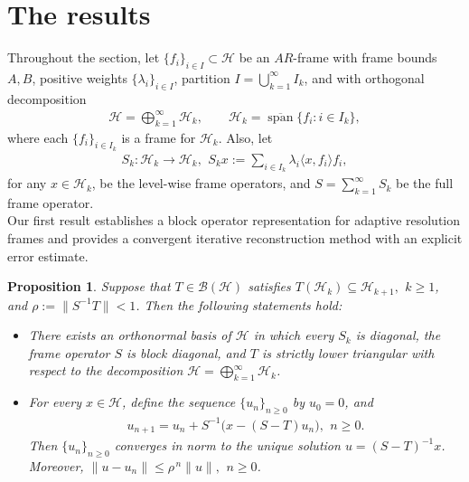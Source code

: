 \documentclass[12pt,titlepage]{amsart}
\newtheorem{prop}[thm]{Proposition}
\theoremstyle{definition}
\theoremstyle{remark}
\begin{document}
\section{\textbf{The results}}
Throughout the section, let $\{f_i\}_{i\in I}\subset\mathcal H$ be
an $AR$-frame with frame bounds $A, B$, positive weights
$\{\lambda_i\}_{i\in I}$, partition $I=\bigcup_{k=1}^\infty I_k$,
and with orthogonal decomposition
\begin{eqnarray*}
\mathcal H=\bigoplus_{k=1}^{\infty}\mathcal H_k, \qquad \mathcal
H_k=\overline{\operatorname{span}}\{f_i:i\in I_k\},
\end{eqnarray*}
where each $\{f_i\}_{i\in I_k}$ is a frame for $\mathcal H_k$.
Also, let
\begin{eqnarray*}
S_k:\mathcal H_k\rightarrow\mathcal H_k, \,\ S_kx:=\sum_{i\in
I_k}\lambda_i\langle x,f_i\rangle f_i,
\end{eqnarray*}
for any $x\in\mathcal H_k$, be the level-wise frame operators, and
$S=\sum_{k=1}^\infty S_k$ be the full frame operator.\\

Our first result establishes a block operator representation for
adaptive resolution frames and provides a convergent iterative
reconstruction method with an explicit error estimate.

\begin{prop} \label{Prop.1}
Suppose that $T\in\mathcal B(\mathcal H)$ satisfies $T(\mathcal
H_k)\subseteq\mathcal H_{k+1}, \,\ k\ge1$, and
$\rho:=\|S^{-1}T\|<1$. Then the following statements hold:
\begin{itemize}
\item[(i)] There exists an orthonormal basis of $\mathcal H$ in
which every $S_k$ is diagonal, the frame operator $S$ is block
diagonal, and $T$ is strictly lower triangular with respect to the
decomposition $\mathcal H=\bigoplus_{k=1}^{\infty}\mathcal H_k$.

\item[(ii)] For every $x\in\mathcal H$, define the sequence
$\{u_n\}_{n\ge0}$ by $u_0=0$, and
\begin{eqnarray} \label{eqn-90}
u_{n+1} = u_n + S^{-1}\bigl(x-(S-T)u_n\bigr), \,\ n\ge0.
\end{eqnarray}
Then $\{u_n\}_{n\geq 0}$ converges in norm to the unique solution
$u=(S-T)^{-1}x$. Moreover, $\|u-u_n\| \le \rho^{\,n}\|u\|, \,\
n\ge0$.
\end{itemize}
\end{prop}
\end{document}
